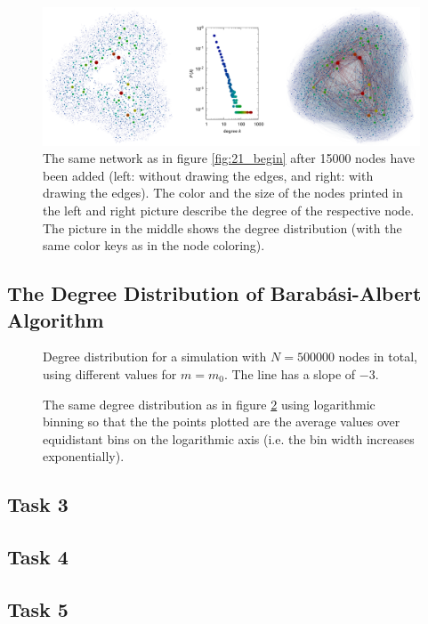 \documentclass{scrartcl}
\begin{document}
\begin{figure}
    \includegraphics[width=\textwidth]{pictures/21_end.pdf}
    \caption{The same network as in figure \ref{fig:21_begin} after 15000
    nodes have been added (left: without drawing the edges, and right: with
    drawing the edges). The color and the size of the nodes printed in the left
    and right picture describe the degree of the respective node. The
    picture in the middle shows the degree distribution (with the same color
    keys as in the node coloring).}
    \label{fig:21_end}
\end{figure}

\subsection{The Degree Distribution of Barab\'asi-Albert Algorithm}
\begin{figure}
    \caption{Degree distribution for a simulation with $N=500000$ nodes
    in total, using different values for $m=m_0$. The line has a slope of
    $-3$.}
    \label{fig:22_plot}
\end{figure}
\begin{figure}
    \caption{The same degree distribution as in figure \ref{fig:22_plot}
    using logarithmic binning so that the the points plotted are the average
    values over equidistant bins on the logarithmic axis (i.e. the bin width
    increases exponentially).}
    \label{fig:22_logplot}
\end{figure}

\subsection{Task 3}
\subsection{Task 4}
\subsection{Task 5}
\end{document}
